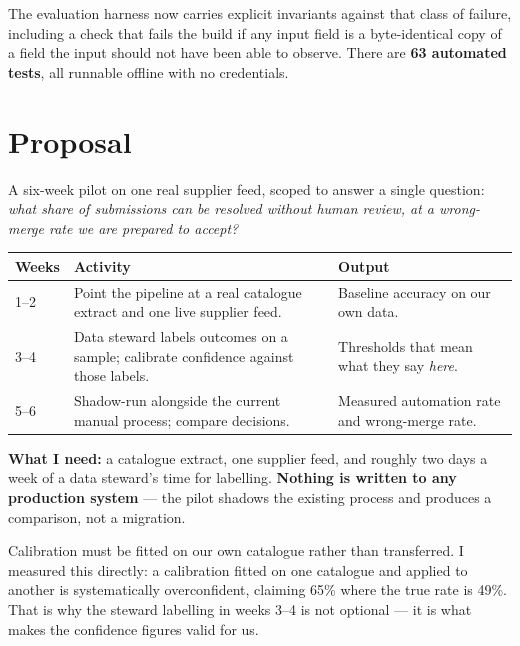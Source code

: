 The evaluation harness now carries explicit invariants against that class of
failure, including a check that fails the build if any input field is a
byte-identical copy of a field the input should not have been able to observe.
There are \textbf{63 automated tests}, all runnable offline with no credentials.

\section{Proposal}

A six-week pilot on one real supplier feed, scoped to answer a single question:
\emph{what share of submissions can be resolved without human review, at a
wrong-merge rate we are prepared to accept?}

\begin{center}
\begin{tabular}{@{}p{2.0cm}p{7.4cm}p{6.6cm}@{}}
\toprule
\textbf{Weeks} & \textbf{Activity} & \textbf{Output} \\
\midrule
1--2 & Point the pipeline at a real catalogue extract and one live supplier feed. & Baseline accuracy on our own data. \\
3--4 & Data steward labels outcomes on a sample; calibrate confidence against those labels. & Thresholds that mean what they say \emph{here}. \\
5--6 & Shadow-run alongside the current manual process; compare decisions. & Measured automation rate and wrong-merge rate. \\
\bottomrule
\end{tabular}
\end{center}

\textbf{What I need:} a catalogue extract, one supplier feed, and roughly two days
a week of a data steward's time for labelling. \textbf{Nothing is written to any
production system} --- the pilot shadows the existing process and produces a
comparison, not a migration.

Calibration must be fitted on our own catalogue rather than transferred. I
measured this directly: a calibration fitted on one catalogue and applied to
another is systematically overconfident, claiming 65\% where the true rate is
49\%. That is why the steward labelling in weeks 3--4 is not optional --- it is
what makes the confidence figures valid for us.

